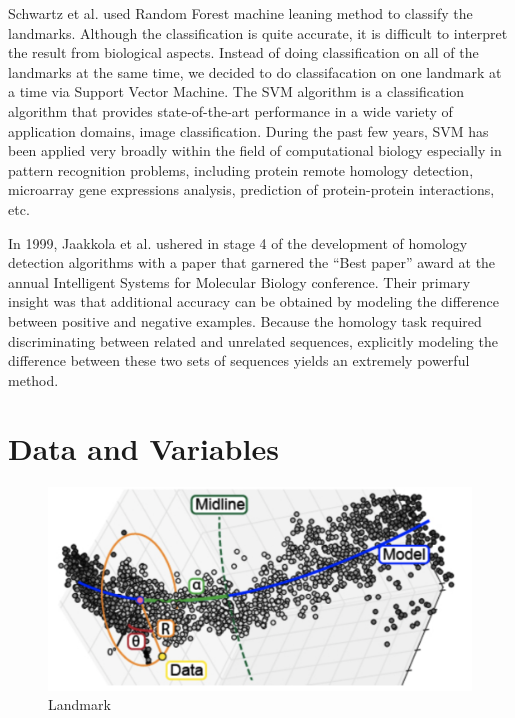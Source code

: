 \documentclass[10pt,letterpaper]{article}
\begin{document}
Schwartz et al. used Random Forest machine leaning method to classify
the landmarks. Although the classification is quite accurate, it is
difficult to interpret the result from biological aspects. Instead of
doing classification on all of the landmarks at the same time, we
decided to do classifacation on one landmark at a time via Support
Vector Machine. The SVM algorithm is a classification algorithm that
provides state-of-the-art performance in a wide variety of application
domains, image classification. During the past few years, SVM has been
applied very broadly within the field of computational biology
especially in pattern recognition problems, including protein remote
homology detection, microarray gene expressions analysis, prediction of
protein-protein interactions, etc.

In 1999, Jaakkola et al. ushered in stage 4 of the development of
homology detection algorithms with a paper that garnered the ``Best
paper'' award at the annual Intelligent Systems for Molecular Biology
conference. Their primary insight was that additional accuracy can be
obtained by modeling the difference between positive and negative
examples. Because the homology task required discriminating between
related and unrelated sequences, explicitly modeling the difference
between these two sets of sequences yields an extremely powerful method.

\section{Data and Variables}\label{data-and-variables}

\begin{figure}[h]

{\centering \includegraphics[width=5.55in]{figures/landmark} 

}

\caption{Landmark}\label{fig:landmark}
\end{figure}
\end{document}
